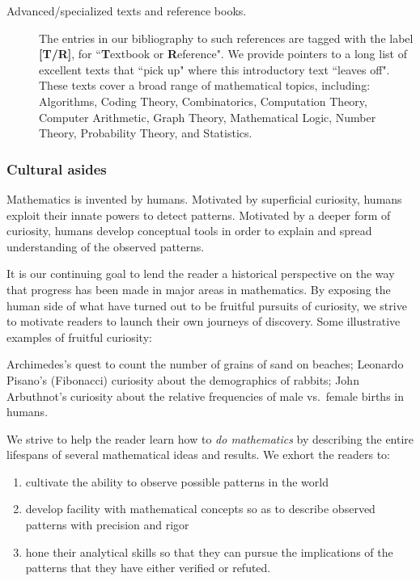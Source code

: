 \begin{description}
\medskip\item[{\sc Advanced/specialized texts and reference books}.]
The entries in our bibliography to such references are tagged with the label {\bf [T/R]}, for ``{\bf T}extbook or {\bf R}eference".  We provide pointers to a long list of excellent texts that ``pick up" where this introductory text ``leaves off".  These texts cover a broad range of mathematical topics, including: Algorithms, Coding Theory, Combinatorics, Computation Theory, Computer Arithmetic, Graph Theory, Mathematical Logic, Number Theory, Probability Theory, and Statistics.
\end{description}


\subsubsection{Cultural asides}

Mathematics is invented by humans.  Motivated by superficial curiosity, humans exploit their innate powers to detect patterns.  Motivated by a deeper form of curiosity, humans develop conceptual tools in order to explain and spread understanding of the observed patterns.

\smallskip

It is our continuing goal to lend the reader a historical perspective on the way that progress has been made in major areas in mathematics.  By exposing the human side of what have turned out to be fruitful pursuits of curiosity, we strive to motivate readers to launch their own journeys of discovery.  Some illustrative examples of fruitful curiosity:

Archimedes's quest to count the number of grains of sand on beaches; Leonardo Pisano's (Fibonacci) curiosity about the demographics of rabbits; John Arbuthnot's curiosity about the relative frequencies of male vs.~female births in humans. 

\smallskip

We strive to help the reader learn how to {\em do mathematics} by describing the entire lifespans of several mathematical ideas and results.  We exhort the readers to:
\begin{enumerate}
\item
cultivate the ability to observe possible patterns in the world
\medskip\item
develop facility with mathematical concepts so as to describe observed patterns with precision and rigor
\medskip\item
hone their analytical skills so that they can pursue the implications of the patterns that they have either verified or refuted.
\end{enumerate}

